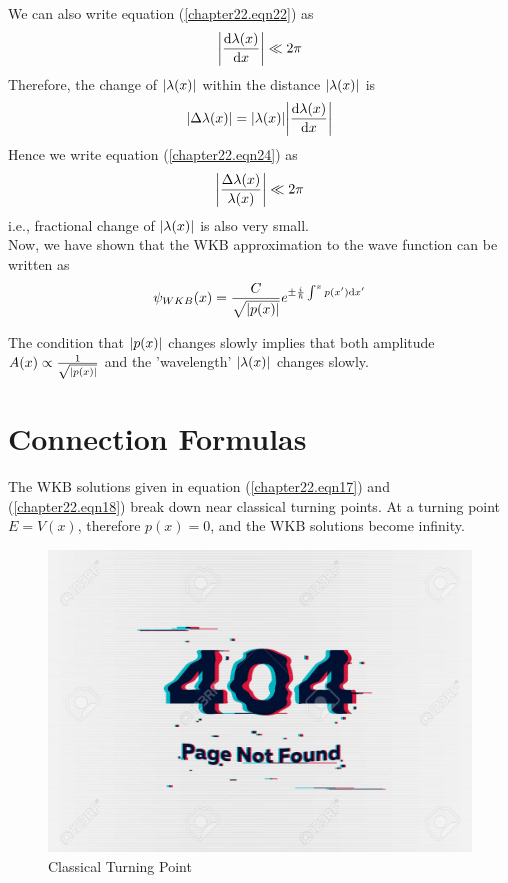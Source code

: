 We can also write equation (\ref{chapter22.eqn22}) as
\begin{equation}
\label{chapter22.eqn24}
\abs{\dv{\lambda(x)}{x}} \ll 2 \pi
\end{equation}
Therefore, the change of $\abs{\lambda(x)}$ within the distance $\abs{\lambda(x)}$ is
\begin{equation}
\abs{\Delta \lambda(x)} = \abs{\lambda(x)} \abs{\dv{\lambda(x)}{x}}
\end{equation}
Hence we write equation (\ref{chapter22.eqn24}) as
\begin{equation}
	\label{chapter22.eqn25}
	\abs{\frac{\Delta \lambda(x)}{\lambda(x)}} \ll 2 \pi
\end{equation}
i.e., fractional change of $\abs{\lambda(x)}$ is also very small.\\

Now, we have shown that the WKB approximation to the wave function can be written as
\begin{equation}
\psi_{WKB}(x) = \frac{C}{\sqrt{\abs{p(x)}}} e^{\pm \frac{{i\mkern1mu}}{\hbar} \int^{x} p(x^\prime) \dd{x^\prime}}
\end{equation}

The condition that $\abs{p(x)}$ changes slowly implies that both amplitude $A(x) \propto \frac{1}{\sqrt{\abs{p(x)}}}$ and the 'wavelength'  $\abs{\lambda(x)}$ changes slowly.




\section{Connection Formulas}

The WKB solutions given in equation (\ref{chapter22.eqn17}) and (\ref{chapter22.eqn18}) break down near classical turning points. At a turning point $E=V(x)$, therefore $p(x)=0$, and the WKB solutions become infinity.

\begin{figure}
	\centering
	\includegraphics[width=0.5\linewidth]{Pictures/not-found.jpg}
	\caption{Classical Turning Point}
	\label{chapter22.fig1}
\end{figure}

